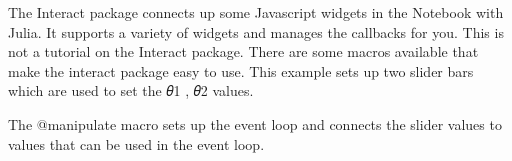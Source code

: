 The Interact package connects up some Javascript widgets in the Notebook
with Julia. It supports a variety of widgets and manages the callbacks
for you. This is not a tutorial on the Interact package. There are some
macros available that make the interact package easy to use. This
example sets up two slider bars which are used to set the 𝜃1 , 𝜃2
values.

The @manipulate macro sets up the event loop and connects the slider
values to values that can be used in the event loop.

\begin{Shaded}
\begin{Highlighting}[]
\OperatorTok{,}\NormalTok{)}
\OperatorTok{=}\NormalTok{)}
\OperatorTok{=}\NormalTok{)}
\OperatorTok{=}\OperatorTok{+}\OperatorTok{+}\NormalTok{)}
\OperatorTok{=}\OperatorTok{+}\OperatorTok{+}\NormalTok{)}
    \OperatorTok{,}\OperatorTok{,}\OperatorTok{,}
\end{Highlighting}
\end{Shaded}

